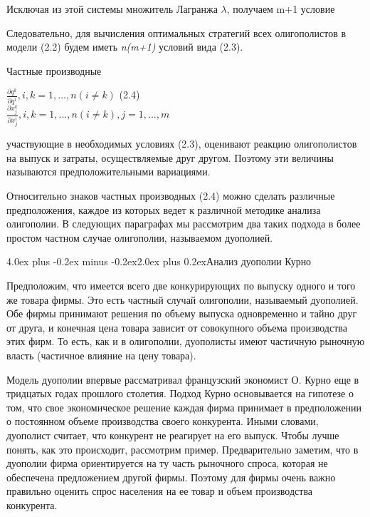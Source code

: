 \documentclass[12pt, 4paper]{book}
\makeatletter
\renewcommand{\section}{\@startsection{section}{1}{1pt}%
	{4.0ex plus -0.2ex minus -0.2ex}{2.0ex plus 0.2ex}{\centering\bf}}%
\makeatother
\begin{document}
{Исключая из этой системы множитель Лагранжа $\lambda$, получаем m+1 условие
\par

Следовательно, для вычисления оптимальных стратегий всех олигополистов в модели (2.2) будем иметь \textit{n(m+1)} условий вида (2.3).
\par

Частные производные
\begin{center}
$\frac{\partial q^k}{\partial q^i} , i,k=1,...,n (i \neq k)$ (2.4)\\
$\frac{\partial x_{j}^k}{\partial x_{j}^i},i,k= 1,...,n (i \neq k), j =1,...,m$
\end{center}
участвующие в необходимых условиях (2.3), оценивают реакцию олигополистов на выпуск и затраты, осуществляемые друг другом. Поэтому эти величины называются предположительными вариациями.
\par

Относительно знаков частных производных (2.4) можно сделать различные предположения, каждое из которых ведет к различной методике анализа олигополии. В следующих параграфах мы рассмотрим два таких подхода в более простом частном случае олигополии, называемом дуополией.
\newpage
\begin{center}
\section{Анализ дуополии Курно}
\end{center}
\par

Предположим, что имеется всего две конкурирующих по выпуску одного и того же товара фирмы. Это есть частный случай олигополии, называемый дуополией. Обе фирмы принимают решения по объему выпуска одновременно и тайно друг от друга, и конечная цена товара зависит от совокупного объема производства этих фирм. То есть, как и в олигополии, дуополисты имеют частичную рыночную власть (частичное влияние на цену товара).
\par

Модель дуополии впервые рассматривал французский экономист О. Курно еще в тридцатых годах прошлого столетия. Подход Курно основывается на гипотезе о том, что свое экономическое решение каждая фирма принимает в предположении о постоянном объеме производства своего конкурента. Иными словами, дуополист считает, что конкурент не реагирует на его выпуск. Чтобы лучше понять, как это происходит, рассмотрим пример. Предварительно заметим, что в дуополии фирма ориентируется на ту часть рыночного спроса, которая не обеспечена предложением другой фирмы. Поэтому для фирмы очень важно правильно оценить спрос населения на ее товар и объем производства конкурента.
\par

}
\end{document}

